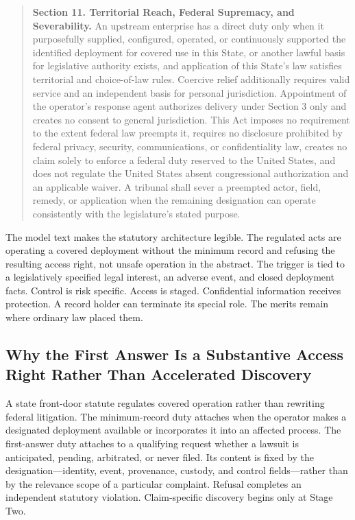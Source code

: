 \begin{quote}
\textbf{Section 11. Territorial Reach, Federal Supremacy, and Severability.} An upstream enterprise has a direct duty only when it purposefully supplied, configured, operated, or continuously supported the identified deployment for covered use in this State, or another lawful basis for legislative authority exists, and application of this State's law satisfies territorial and choice-of-law rules. Coercive relief additionally requires valid service and an independent basis for personal jurisdiction. Appointment of the operator's response agent authorizes delivery under Section 3 only and creates no consent to general jurisdiction. This Act imposes no requirement to the extent federal law preempts it, requires no disclosure prohibited by federal privacy, security, communications, or confidentiality law, creates no claim solely to enforce a federal duty reserved to the United States, and does not regulate the United States absent congressional authorization and an applicable waiver. A tribunal shall sever a preempted actor, field, remedy, or application when the remaining designation can operate consistently with the legislature's stated purpose.
\end{quote}

The model text makes the statutory architecture legible. The regulated acts are operating a covered deployment without the minimum record and refusing the resulting access right, not unsafe operation in the abstract. The trigger is tied to a legislatively specified legal interest, an adverse event, and closed deployment facts. Control is risk specific. Access is staged. Confidential information receives protection. A record holder can terminate its special role. The merits remain where ordinary law placed them.

\subsection{Why the First Answer Is a Substantive Access Right Rather Than Accelerated Discovery}
\label{sec:erie}

A state front-door statute regulates covered operation rather than rewriting federal litigation. The minimum-record duty attaches when the operator makes a designated deployment available or incorporates it into an affected process. The first-answer duty attaches to a qualifying request whether a lawsuit is anticipated, pending, arbitrated, or never filed. Its content is fixed by the designation---identity, event, provenance, custody, and control fields---rather than by the relevance scope of a particular complaint. Refusal completes an independent statutory violation. Claim-specific discovery begins only at Stage Two.


